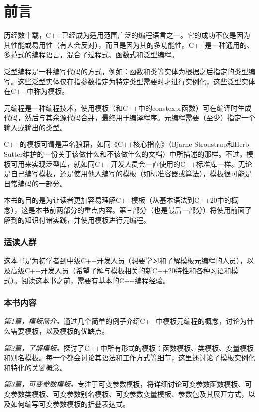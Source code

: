 \chapter{前言}

历经数十载，C++已经成为适用范围广泛的编程语言之一。它的成功不仅是因为其性能或易用性（有人会反对），而且是因为其的多功能性。C++是一种通用的、多范式的编程语言，混合了过程式、函数式和泛型编程。

泛型编程是一种编写代码的方式，例如：函数和类等实体为根据之后指定的类型编写。这些泛型实体仅在指参数指定为特定类型需要时才进行实例化，这些泛型实体在C++中称为模板。

元编程是一种编程技术，使用模板（和C++中的constexpr函数）可在编译时生成代码，然后与其余源代码合并，最终用于编译程序。元编程需要（至少）指定一个输入或输出的类型。

C++的模板可谓是声名狼藉，如同《C++核心指南》（Bjarne Stroustrup和Herb Sutter维护的一份关于该做什么和不该做什么的文档）中所描述的那样。不过，模板可用来实现泛型库，就如同C++开发人员会一直使用的C++标准库一样。无论是自己编写模板，还是使用他人编写的模板（如标准容器或算法），模板很可能是日常编码的一部分。

本书的目的是为让读者更加容易理解C++模板（从基本语法到C++20中的概念），这是本书前两部分的重点内容。第三部分（也是最后一部分）将使用前面了解到的知识付诸实践，并使用模板进行元编程。

\subsection{适读人群}

这本书是为初学者到中级C++开发人员（想要学习和了解模板元编程的人员），以及高级C++开发人员（希望了解与模板相关的新C++20特性和各种习语和模式）。阅读这本书之前，需要有基本的C++编程经验。

\subsection{本书内容}

\textit{第1章，模板简介。}通过几个简单的例子介绍C++中模板元编程的概念，讨论为什么需要模板，以及模板的优缺点。

\textit{第2章，了解模板。}探讨了C++中所有形式的模板：函数模板、类模板、变量模板和别名模板。每一个都会讨论其语法和工作方式等细节，这里还讨论了模板实例化和特化的关键概念。

\textit{第3章，可变参数模板。}专注于可变参数模板，将详细讨论可变参数函数模板、可变参数类模板、可变参数别名模板、可变参数变量模板、参数包及其展开方式，以及如何编写可变参数模板的折叠表达式。

